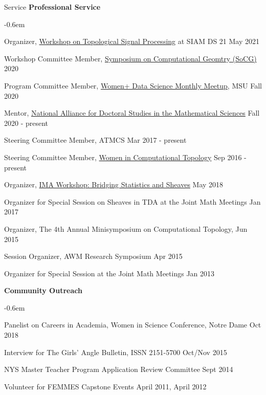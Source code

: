 \documentclass{resume} %
\begin{document}
\begin{rSection}{Service}
\textbf{Professional Service}
\begin{list}{}{\leftmargin=1em}
   \itemsep -0.6em \vspace{-0.5em} %
\item Organizer, \href{https://meetings.siam.org/sess/dsp_programsess.cfm?SESSIONCODE=71292}
{Workshop on Topological Signal Processing} at SIAM DS 21 \hfill May 2021
\item
Workshop Committee Member, \href{https://socg20.inf.ethz.ch/}{Symposium on Computational Geomtry (SoCG)} \hfill 2020
\item
Program Committee Member, \href{https://women-plus-datascience.github.io/}{Women+ Data Science Monthly Meetup}, MSU \hfill Fall 2020 %
\item Mentor, \href{https://mathalliance.org/mentor/liz-munch/}{National Alliance for Doctoral Studies in the Mathematical Sciences} \hfill Fall 2020 - present
\item
Steering Committee Member, ATMCS \hfill Mar 2017 - present
\item
Steering Committee Member, \href{https://awmadvance.org/research-networks/wincomptop-women-in-computational-topology/}{Women in Computational Topology} \hfill Sep 2016 - present
\item
Organizer, \href{https://www.ima.umn.edu/2017-2018/SW5.21-25.18}{IMA Workshop: Bridging Statistics and Sheaves} \hfill May 2018
\item
{Organizer for Special Session on Sheaves in TDA at the Joint Math Meetings} \hfill Jan 2017
\item
{Organizer, The 4th Annual Minisymposium on Computational Topology,  } \hfill Jun 2015\\
\phantom{MMM}{CG Week at the Symposium on Computational Geometry}
\item
{Session Organizer, AWM Research Symposium} \hfill Apr 2015
\item
{Organizer for Special Session at the Joint Math Meetings} \hfill Jan 2013
\end{list}


\textbf{Community Outreach}
\begin{list}{}{\leftmargin=1em}
   \itemsep -0.6em \vspace{-0.5em} %
\item
Panelist on Careers in Academia, Women in Science Conference, Notre Dame \hfill Oct 2018
\item Interview for The Girls' Angle Bulletin,  ISSN 2151-5700 \hfill Oct/Nov 2015
\item
{NYS Master Teacher Program Application Review Committee} \hfill Sept 2014
\item
{Volunteer for FEMMES  Capstone Events} \hfill April 2011, April 2012
\end{list}


\end{rSection}
\end{document}
